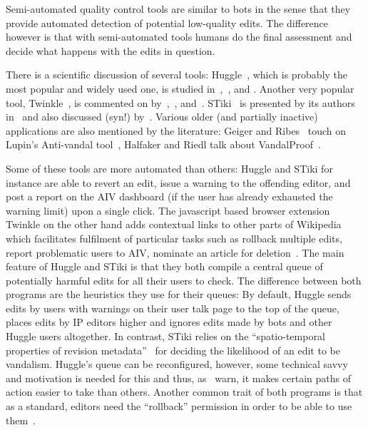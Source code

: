 Semi-automated quality control tools are similar to bots in the sense that they provide automated detection of potential low-quality edits.
The difference however is that with semi-automated tools humans do the final assessment and decide what happens with the edits in question.

There is a scientific discussion of several tools:
Huggle~\cite{Wikipedia:Huggle}, which is probably the most popular and widely used one, is studied in~\cite{GeiHal2013},~\cite{HalRied2012}, and \cite{GeiRib2010}.
Another very popular tool, Twinkle~\cite{Wikipedia:Twinkle}, is commented on by~\cite{GeiHal2013},~\cite{GeiRib2010}, and~\cite{HalGeiMorRied2013}.
STiki~\cite{Wikipedia:STiki} is presented by its authors in~\cite{WestKanLee2010} and also discussed (syn!) by~\cite{GeiHal2013}.
Various older (and partially inactive) applications are also mentioned by the literature:
Geiger and Ribes~\cite{GeiRib2010} touch on Lupin's Anti-vandal tool~\cite{Wikipedia:LupinAntiVandal},
Halfaker and Riedl talk about VandalProof~\cite{HalRied2012}.

Some of these tools are more automated than others: Huggle and STiki for instance are able to revert an edit, issue a warning to the offending editor, and post a report on the AIV dashboard (if the user has already exhausted the warning limit) upon a single click.
The javascript based browser extension Twinkle on the other hand adds contextual links to other parts of Wikipedia which facilitates fulfilment of particular tasks such as rollback multiple edits, report problematic users to AIV, nominate an article for deletion~\cite{GeiRib2010}.
The main feature of Huggle and STiki is that they both compile a central queue of potentially harmful edits for all their users to check.
The difference between both programs are the heuristics they use for their queues:
By default, Huggle sends edits by users with warnings on their user talk page to the top of the queue, places edits by IP editors higher and ignores edits made by bots and other Huggle users altogether\cite{GeiRib2010}.
In contrast, STiki relies on the ``spatio-temporal properties of revision metadata''~\cite{WestKanLee2010} for deciding the likelihood of an edit to be vandalism.
Huggle's queue can be reconfigured, however, some technical savvy and motivation is needed for this and thus, as~\cite{GeiRib2010} warn, it makes certain paths of action easier to take than others.
Another common trait of both programs is that as a standard, editors need the ``rollback'' permission in order to be able to use them~\cite{HalRied2012}. %

